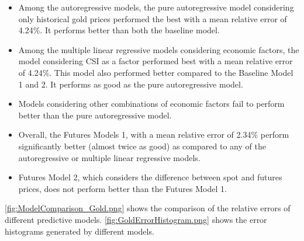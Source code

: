 \documentclass[runningheads]{llncs}
\begin{document}
\begin {itemize}

\item Among the autoregressive models, the pure autoregressive model considering only historical gold prices performed the best with a mean relative error of 4.24\%. It performs better than both the baseline model. \\
\item Among the multiple linear regressive models considering economic factors, the model considering CSI as a factor performed best with a mean relative error of 4.24\%. This model also performed better compared to the Baseline Model 1 and 2. It performs as good as the pure autoregressive model. \\
\item Models considering other combinations of economic factors fail to perform better than the pure autoregressive model.\\
\item Overall, the Futures Models 1, with a mean relative error of 2.34\% perform significantly better (almost twice as good) as compared to any of the autoregressive or multiple linear regressive models. \\
\item Futures Model 2, which considers the difference between spot and futures prices, does not perform better than the Futures Model 1.

\end {itemize}


\autoref{fig:ModelComparison_Gold.png} shows the comparison of the relative errors of different predictive models. \autoref{fig:GoldErrorHistogram.png} shows the error histograms generated by different models.
\end{document}
